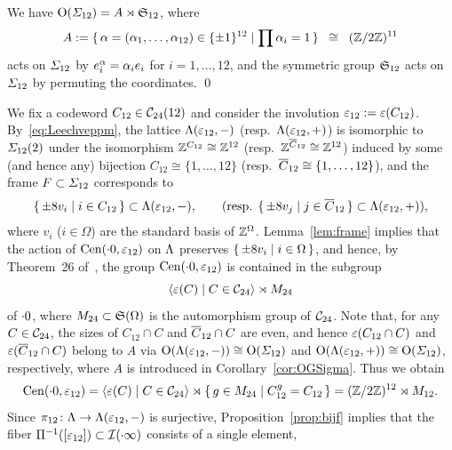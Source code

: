 \documentclass{amsart} %
\begin{document}
%
\begin{corollary}\label{cor:OGSigma}
We have $\mathord{\mathrm{O}}(\varSigma_{12})=A\rtimes\mathord{\mathfrak{S}}_{12}$,
where
\[
A:=\{\,{\alpha=(\alpha_1, \dots, \alpha_{12})\in \{\pm 1\}^{12}}\mid {\prod\alpha_i=1} \,\}\;\; \cong\;\; (\mathord{\mathbb{Z}}/2\mathord{\mathbb{Z}})^{11}
\]
acts on $\varSigma_{12}$ by $e_i\sp{\alpha}=\alpha_i e_i$ for $i=1, \dots, 12$, 
and
the symmetric group $\mathord{\mathfrak{S}}_{12}$ 
acts on $\varSigma_{12}$ by permuting the coordinates.
\qed
\end{corollary}
%
We fix a codeword $C_{12}\in \mathord{\mathcal{C}}_{24}(12)$ and 
consider the involution 
$\varepsilon_{12}:=\varepsilon(C_{12})$.
%
By~\eqref{eq:Leechveppm}, 
the lattice $\Lambda (\varepsilon_{12}, -)$ (resp.~$\Lambda (\varepsilon_{12}, +)$)
is isomorphic 
 to $\varSigma_{12} (2)$ under 
the isomorphism $\mathord{\mathbb{Z}}^{C_{12}}\cong \mathord{\mathbb{Z}}^{12}$ (resp.~$\mathord{\mathbb{Z}}^{\overline{C}_{12}}\cong \mathord{\mathbb{Z}}^{12}$)
induced by some (and hence any) bijection 
$C_{12}\cong \{1, \dots, 12\}$ (resp.~$\overline{C}_{12}\cong \{1, \dots, 12\}$),
and the frame $F\subset \varSigma_{12}$ corresponds to
\[
\{\,{\pm 8 v_i}\mid {i\in C_{12}} \,\}\subset \Lambda(\varepsilon_{12}, -),
\qquad 
(\textrm{resp. }
\{\,{\pm 8 v_j}\mid {j\in \overline{C}_{12}} \,\}\subset \Lambda(\varepsilon_{12}, +)),
\]
where $v_i$ ($i\in \Omega$) are the standard basis of $\mathord{\mathbb{Z}}^{\Omega}$.
Lemma~\ref{lem:frame}
implies that the action of $\mathrm{Cen}(\cdot 0, \varepsilon_{12})$ 
on $\Lambda$ preserves $\{\,{\pm 8 v_i}\mid {i\in \Omega} \,\}$,
and hence, by Theorem~26 of~\cite[Chapter~10, Section~3.3]{theCSbook}, 
the group $\mathrm{Cen}(\cdot 0, \varepsilon_{12}) $ is contained 
in the subgroup
\[
\langle {\varepsilon(C) \mid C \in \mathord{\mathcal{C}}_{24}} \rangle\rtimes M_{24} 
\]
of $\cdot 0$,
where $M_{24}\subset \mathord{\mathfrak{S}}(\Omega)$ is the automorphism group of $ \mathord{\mathcal{C}}_{24}$.
Note that, for any $C\in \mathord{\mathcal{C}}_{24}$,
the sizes of $C_{12}\cap C$ and $\overline{C}_{12}\cap C$
are even, and hence 
$\varepsilon(C_{12}\cap C)$ and $\varepsilon( \overline{C}_{12}\cap C)$ belong to $ A$ via 
$ \mathord{\mathrm{O}}(\Lambda(\varepsilon_{12}, -))\cong \mathord{\mathrm{O}}(\varSigma_{12})$ and $ \mathord{\mathrm{O}}(\Lambda(\varepsilon_{12}, +))\cong \mathord{\mathrm{O}}(\varSigma_{12})$,
respectively,
where $A$ is introduced in Corollary~\ref{cor:OGSigma}.
Thus we obtain 
%
\begin{equation}\label{eq:M12}
\mathrm{Cen}(\cdot 0, \varepsilon_{12})=\langle {\varepsilon(C) \mid C \in \mathord{\mathcal{C}}_{24}} \rangle\rtimes \{\,{g\in M_{24}}\mid {C_{12}^g=C_{12}} \,\}=(\mathord{\mathbb{Z}}/2\mathord{\mathbb{Z}})^{12}\rtimes  M_{12}.
\end{equation}
%
Since $\pi_{12}\colon \Lambda\to \Lambda(\varepsilon_{12}, -)$ is surjective,
Proposition~\ref{prop:bijf} implies that the fiber $\Pi^{-1} ([\varepsilon_{12}])\subset \mathord{\mathcal{I}}(\cdot \infty)$ consists of a single element,
\end{document}
